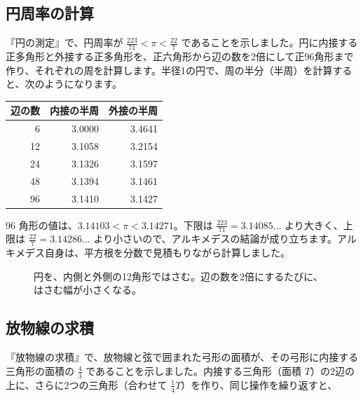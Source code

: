 \documentclass[a4paper,11pt,openany]{ltjsbook}
\begin{document}
\subsection{円周率の計算}

『円の測定』で、円周率が $\tfrac{223}{71}<\pi<\tfrac{22}{7}$ であることを示しました。円に内接する正多角形と外接する正多角形を、正六角形から辺の数を2倍にして正96角形まで作り、それぞれの周を計算します。半径1の円で、周の半分（半周）を計算すると、次のようになります。

\begin{center}
\begin{tabular}{rrr}
\toprule
辺の数 & 内接の半周 & 外接の半周\\
\midrule
6 & 3.0000 & 3.4641\\
12 & 3.1058 & 3.2154\\
24 & 3.1326 & 3.1597\\
48 & 3.1394 & 3.1461\\
96 & 3.1410 & 3.1427\\
\bottomrule
\end{tabular}
\end{center}

$96$ 角形の値は、$3.14103<\pi<3.14271$。下限は $\tfrac{223}{71}=3.14085\ldots$ より大きく、上限は $\tfrac{22}{7}=3.14286\ldots$ より小さいので、アルキメデスの結論が成り立ちます。アルキメデス自身は、平方根を分数で見積もりながら計算しました。

\begin{figure}[htbp]
\centering
{}
\caption{円を、内側と外側の12角形ではさむ。辺の数を2倍にするたびに、はさむ幅が小さくなる。}
\end{figure}

\subsection{放物線の求積}

『放物線の求積』で、放物線と弦で囲まれた弓形の面積が、その弓形に内接する三角形の面積の $\tfrac43$ であることを示しました。内接する三角形（面積 $T$）の2辺の上に、さらに2つの三角形（合わせて $\tfrac14T$）を作り、同じ操作を繰り返すと、
\end{document}

